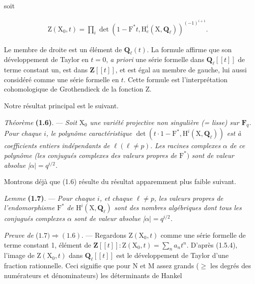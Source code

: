 \documentclass[10pt,leqno]{article}
\begin{document}
\noindent soit\par

\begin{equation*}\begin{gathered}\mathrm{Z}(\mathrm{X}_{0},t) = \prod _{i} \operatorname{det}(1- \mathrm{F}^{*}t, \mathrm{H}_{c}^{i}(\mathrm{X},\mathbf{Q}_{\ell }))^{(- 1)^{i+1}}.\end{gathered}\tag{1.5.4}\end{equation*}

\noindent Le membre de droite est un élément de \(\mathbf{Q}_{\ell }(t)\). La formule affirme que son développement de Taylor en \(t=0\), \emph{a priori} une série formelle dans \(\mathbf{Q}_{\ell }[[t]]\) de terme constant un, est dans \(\mathbf{Z}[[t]]\), et est égal au membre de gauche, lui aussi considéré comme une série formelle en \(t\). Cette formule est l’interprétation cohomologique de Grothendieck de la fonction \(\mathrm{Z}\).\par

\noindent Notre résultat principal est le suivant.\par

\noindent \emph{Théorème} \textbf{(1.6)}. — {\itshape Soit \(\mathrm{X}_{0}\) une variété projective non singulière (= lisse) sur \(\mathbf{F}_{q}\). Pour chaque \(i\), le polynôme caractéristique \(\operatorname{det}(t\cdot 1- \mathrm{F}^{*}, \mathrm{H}^{i}(\mathrm{X},\mathbf{Q}_{\ell }))\) est à coefficients entiers indépendants de \(\ell  (\ell \ne p)\). Les racines complexes \(\alpha \) de ce polynôme (les conjugués complexes des valeurs propres de \(\mathrm{F}^{*})\) sont de valeur absolue |\(\alpha |=q^{i/2}\).}\par

\noindent Montrons déjà que (1.6) résulte du résultat apparemment plus faible suivant.\par

\noindent \emph{Lemme} \textbf{(1.7)}. — {\itshape Pour chaque \(i\), et chaque \(\ell \ne p\), les valeurs propres de l’endomorphisme \(\mathrm{F}^{*}\) de \(\mathrm{H}^{i}(\mathrm{X},\mathbf{Q}_{\ell })\) sont des nombres algébriques dont tous les conjugués complexes \(\alpha \) sont de valeur absolue |\(\alpha |=q^{i/2}\).}\par

\noindent \emph{Preuve de} (\(1.7) \Rightarrow  (1.6)\). — Regardons \(\mathrm{Z}(\mathrm{X}_{0},t)\) comme une série formelle de terme constant 1, élément de \(\mathbf{Z}[[t]] : \mathrm{Z}(\mathrm{X}_{0},t)=\sum _{n} a_{n} t^{n}\). D’après (1.5.4), l’image de \(\mathrm{Z}(\mathrm{X}_{0},t)\) dans \(\mathbf{Q}_{\ell }[[t]]\) est le développement de Taylor d’une fraction rationnelle. Ceci signifie que pour \(\mathrm{N}\) et \(\mathrm{M}\) assez grands (\(\geq \) les degrés des numérateurs et dénominateurs) les déterminants de Hankel\par
\end{document}
